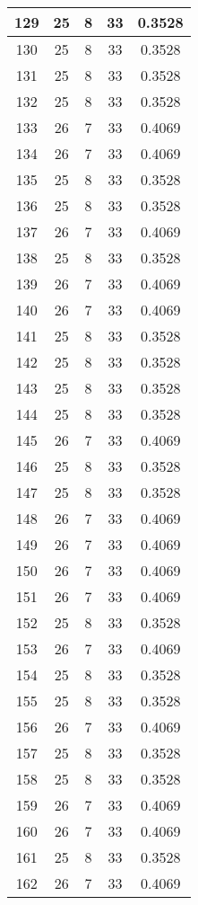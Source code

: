 \documentclass[letterpaper, 12pt]{article}
\begin{document}
\begin{longtable}{|c|c|c|c|c|}
\hline
129 & 25 & 8 & 33 & 0.3528 \\
\hline
130 & 25 & 8 & 33 & 0.3528 \\
\hline
131 & 25 & 8 & 33 & 0.3528 \\
\hline
132 & 25 & 8 & 33 & 0.3528 \\
\hline
133 & 26 & 7 & 33 & 0.4069 \\
\hline
134 & 26 & 7 & 33 & 0.4069 \\
\hline
135 & 25 & 8 & 33 & 0.3528 \\
\hline
136 & 25 & 8 & 33 & 0.3528 \\
\hline
137 & 26 & 7 & 33 & 0.4069 \\
\hline
138 & 25 & 8 & 33 & 0.3528 \\
\hline
139 & 26 & 7 & 33 & 0.4069 \\
\hline
140 & 26 & 7 & 33 & 0.4069 \\
\hline
141 & 25 & 8 & 33 & 0.3528 \\
\hline
142 & 25 & 8 & 33 & 0.3528 \\
\hline
143 & 25 & 8 & 33 & 0.3528 \\
\hline
144 & 25 & 8 & 33 & 0.3528 \\
\hline
145 & 26 & 7 & 33 & 0.4069 \\
\hline
146 & 25 & 8 & 33 & 0.3528 \\
\hline
147 & 25 & 8 & 33 & 0.3528 \\
\hline
148 & 26 & 7 & 33 & 0.4069 \\
\hline
149 & 26 & 7 & 33 & 0.4069 \\
\hline
150 & 26 & 7 & 33 & 0.4069 \\
\hline
151 & 26 & 7 & 33 & 0.4069 \\
\hline
152 & 25 & 8 & 33 & 0.3528 \\
\hline
153 & 26 & 7 & 33 & 0.4069 \\
\hline
154 & 25 & 8 & 33 & 0.3528 \\
\hline
155 & 25 & 8 & 33 & 0.3528 \\
\hline
156 & 26 & 7 & 33 & 0.4069 \\
\hline
157 & 25 & 8 & 33 & 0.3528 \\
\hline
158 & 25 & 8 & 33 & 0.3528 \\
\hline
159 & 26 & 7 & 33 & 0.4069 \\
\hline
160 & 26 & 7 & 33 & 0.4069 \\
\hline
161 & 25 & 8 & 33 & 0.3528 \\
\hline
162 & 26 & 7 & 33 & 0.4069 \\

\end{longtable}
\end{document}
